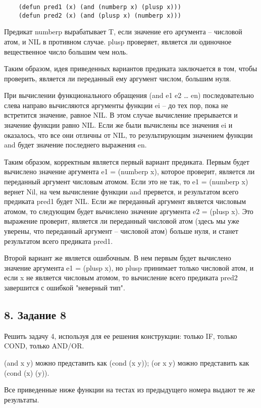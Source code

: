 \begin{lstlisting}
	(defun pred1 (x) (and (numberp x) (plusp x))) 
	(defun pred2 (x) (and (plusp x) (numberp x)))
\end{lstlisting}

Предикат numberp вырабатывает T, если значение его аргумента – числовой атом, и NIL в противном случае. plusp проверяет, является ли одиночное вещественное число большим чем ноль.

Таким образом, идея приведенных вариантов предиката заключается в том, чтобы проверить, является ли переданный ему аргумент числом, большим нуля.

При вычислении функционального обращения (and e1 e2 … en) последовательно слева направо вычисляются аргументы функции ei – до тех пор, пока не  встретится значение, равное NIL. В этом случае вычисление прерывается и значение функции равно NIL. Если же были вычислены все значения ei и  оказалось, что все они отличны от NIL, то результирующим значением функции and будет значение последнего выражения en.

Таким образом, корректным является первый вариант предиката. Первым будет вычислено значение аргумента e1 = (numberp x), которое проверит, является ли переданный аргумент числовым атомом. Если это не так, то e1 = (numberp x) вернет Nil, на чем вычисление функции and прервется, и результатом всего предиката pred1 будет NIL. Если же переданный аргумент является числовым атомом, то следующим будет вычислено значение аргумента e2 = (plusp x). Это выражение проверит, является ли переданный числовой атом (здесь мы уже уверены, что переданный аргумент -- числовой атом) больше нуля, и станет результатом всего предиката pred1.

Второй вариант же является ошибочным. В нем первым будет вычислено значение аргумента e1 = (plusp x), но plusp принимает только числовой атом, и если x не является числовым атомом, то вычисление всего предиката pred2 завершится с ошибкой "неверный тип".

\subsection*{8. Задание 8}

Решить задачу 4, используя для ее решения конструкции: только IF, только COND, только AND/OR.

(and x y) можно представить как (cond (x y)); (or x y) можно представить как (cond (x) (y)).

Все приведенные ниже функции на тестах из предыдущего номера выдают те же результаты.

